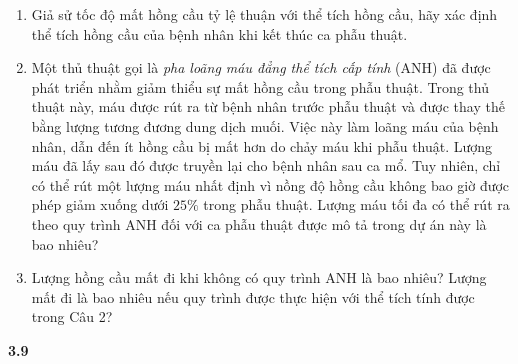 \begin{tcolorbox}[
  colback=lightgreenbg,
  colframe=lightgreenbg,
  arc=0mm,
  boxrule=0pt,
  left=6pt, right=8pt, top=4pt, bottom=6pt
]
\begin{minipage}[t]{0.72\textwidth}
    \begin{enumerate}[label=\textbf{\arabic*.}, leftmargin=14pt, itemsep=2pt, topsep=2pt]
      \item Giả sử tốc độ mất hồng cầu tỷ lệ thuận với thể tích hồng cầu, hãy xác định thể tích hồng cầu của bệnh nhân khi kết thúc ca phẫu thuật.
      \item Một thủ thuật gọi là \emph{pha loãng máu đẳng thể tích cấp tính} (ANH) đã được phát triển nhằm giảm thiểu sự mất hồng cầu trong phẫu thuật. Trong thủ thuật này, máu được rút ra từ bệnh nhân trước phẫu thuật và được thay thế bằng lượng tương đương dung dịch muối. Việc này làm loãng máu của bệnh nhân, dẫn đến ít hồng cầu bị mất hơn do chảy máu khi phẫu thuật. Lượng máu đã lấy sau đó được truyền lại cho bệnh nhân sau ca mổ. Tuy nhiên, chỉ có thể rút một lượng máu nhất định vì nồng độ hồng cầu không bao giờ được phép giảm xuống dưới $25\%$ trong phẫu thuật. Lượng máu tối đa có thể rút ra theo quy trình ANH đối với ca phẫu thuật được mô tả trong dự án này là bao nhiêu?
      \item Lượng hồng cầu mất đi khi không có quy trình ANH là bao nhiêu? Lượng mất đi là bao nhiêu nếu quy trình được thực hiện với thể tích tính được trong Câu 2?
    \end{enumerate}
  \end{minipage}
\end{tcolorbox}

\vspace{10pt}

\noindent
\begin{minipage}[c]{0.22\textwidth}
\end{minipage}%
\hspace{8pt}%
\begin{minipage}[c]{0.74\textwidth}
  {\Huge\bfseries\color{stewartblue}3.9}
\end{minipage}

\vspace{8pt}

